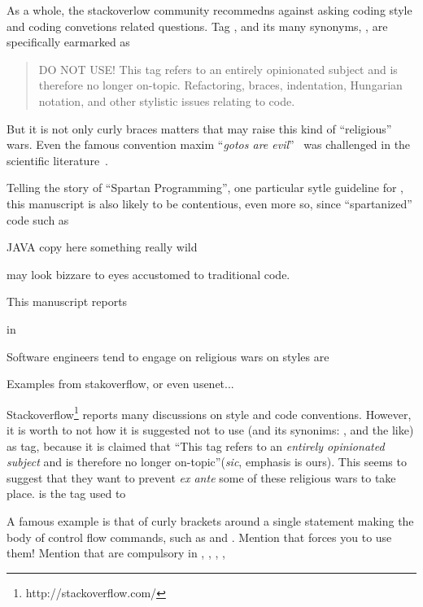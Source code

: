 As a whole, the stackoverlow community 
recommedns against asking coding style and coding convetions related questions. 
Tag , and its many synonyms, , 
 are specifically 
earmarked as 
\begin{quote}
DO NOT USE! This tag refers to an entirely opinionated subject and is therefore 
no longer on-topic. Refactoring, braces, indentation, Hungarian notation, and 
other stylistic issues relating to code. 
\end{quote}
But it is not only curly braces matters that may raise 
this kind of ``religious'' wars. Even the famous convention maxim ``\emph{gotos 
are evil}''~\cite{Dijksta:must be in bib} was challenged in the scientific 
literature~\cite{Knuth: and there are several others}.

Telling the story of ``Spartan Programming'', one particular sytle guideline for 
\Java, this manuscript is also likely to be contentious, even more so, since 
``spartanized'' code such as 
\begin{code}{JAVA}
copy here something really wild
\end{code}
may look bizzare to eyes accustomed to traditional \Java code.



This manuscript reports 

in 

\Java
Software engineers tend to engage  on religious wars on styles are

Examples from stakoverflow, or even usenet... 

Stackoverflow\footnote{http://stackoverflow.com/} reports many discussions on style and code conventions. 
However, it is worth to not how it is suggested not to use  (and its synonims: , 
 and the like) as tag, because it is claimed that 
``This tag refers to an \emph{entirely opinionated subject} and is therefore no longer on-topic''(\emph{sic}, 
emphasis is ours). 
This seems to suggest that they want to prevent \emph{ex ante} some of these religious wars to take place.
 is the tag used to 

A famous example is that of curly brackets around a single statement making
the body of control flow commands, such as  and 
.
Mention that \Go forces you to use them!
Mention that are compulsory in , 
,  
,  
,  

